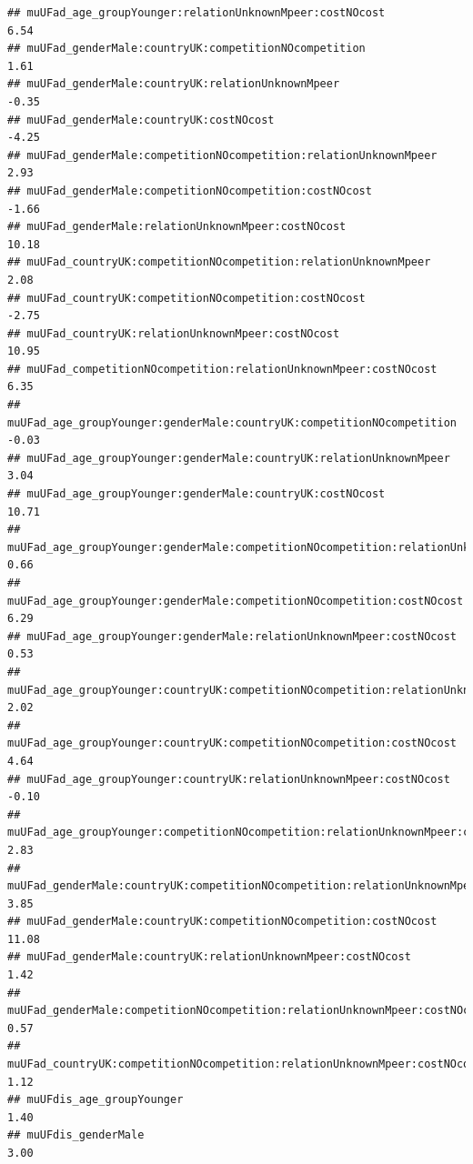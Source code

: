 \documentclass[
]{article}
\begin{document}
\begin{verbatim}
## muUFad_age_groupYounger:relationUnknownMpeer:costNOcost                               6.54
## muUFad_genderMale:countryUK:competitionNOcompetition                                  1.61
## muUFad_genderMale:countryUK:relationUnknownMpeer                                     -0.35
## muUFad_genderMale:countryUK:costNOcost                                               -4.25
## muUFad_genderMale:competitionNOcompetition:relationUnknownMpeer                       2.93
## muUFad_genderMale:competitionNOcompetition:costNOcost                                -1.66
## muUFad_genderMale:relationUnknownMpeer:costNOcost                                    10.18
## muUFad_countryUK:competitionNOcompetition:relationUnknownMpeer                        2.08
## muUFad_countryUK:competitionNOcompetition:costNOcost                                 -2.75
## muUFad_countryUK:relationUnknownMpeer:costNOcost                                     10.95
## muUFad_competitionNOcompetition:relationUnknownMpeer:costNOcost                       6.35
## muUFad_age_groupYounger:genderMale:countryUK:competitionNOcompetition                -0.03
## muUFad_age_groupYounger:genderMale:countryUK:relationUnknownMpeer                     3.04
## muUFad_age_groupYounger:genderMale:countryUK:costNOcost                              10.71
## muUFad_age_groupYounger:genderMale:competitionNOcompetition:relationUnknownMpeer      0.66
## muUFad_age_groupYounger:genderMale:competitionNOcompetition:costNOcost                6.29
## muUFad_age_groupYounger:genderMale:relationUnknownMpeer:costNOcost                    0.53
## muUFad_age_groupYounger:countryUK:competitionNOcompetition:relationUnknownMpeer       2.02
## muUFad_age_groupYounger:countryUK:competitionNOcompetition:costNOcost                 4.64
## muUFad_age_groupYounger:countryUK:relationUnknownMpeer:costNOcost                    -0.10
## muUFad_age_groupYounger:competitionNOcompetition:relationUnknownMpeer:costNOcost      2.83
## muUFad_genderMale:countryUK:competitionNOcompetition:relationUnknownMpeer             3.85
## muUFad_genderMale:countryUK:competitionNOcompetition:costNOcost                      11.08
## muUFad_genderMale:countryUK:relationUnknownMpeer:costNOcost                           1.42
## muUFad_genderMale:competitionNOcompetition:relationUnknownMpeer:costNOcost            0.57
## muUFad_countryUK:competitionNOcompetition:relationUnknownMpeer:costNOcost             1.12
## muUFdis_age_groupYounger                                                              1.40
## muUFdis_genderMale                                                                    3.00

\end{verbatim}
\end{document}
